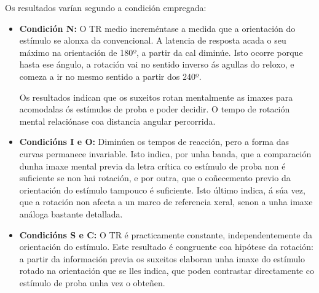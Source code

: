 \documentclass[a4paper,11pt]{article}
\begin{document}
Os resultados varían segundo a condición empregada:
\begin{itemize}
	\item \textbf{Condición N:} O TR medio increméntase a medida que a orientación do estímulo se 
	alonxa da convencional. A latencia de resposta acada o seu máximo na orientación de 180º, a 
	partir da cal diminúe. Isto ocorre porque hasta ese ángulo, a rotación vai no sentido inverso ás 
	agullas do reloxo, e comeza a ir no mesmo sentido a partir dos 240º. 
	
	Os resultados indican que os suxeitos rotan mentalmente as imaxes para acomodalas ós estímulos 
	de proba e poder decidir. O tempo de rotación mental relaciónase coa distancia angular 
	percorrida.
	\item \textbf{Condicións I e O:} Diminúen os tempos de reacción, pero a forma das curvas 
	permanece invariable. Isto indica, por unha banda, que a comparación dunha imaxe mental previa 
	da letra crítica co estímulo de proba non é suficiente se non hai rotación, e por outra, que o 
	coñecemento previo da orientación do estímulo tampouco é suficiente. Isto último indica, á súa 
	vez, que a rotación non afecta a un marco de referencia xeral, senon a unha imaxe análoga 
	bastante detallada.
	\item \textbf{Condicións S e C:} O TR é practicamente constante, independentemente da 
	orientación do estímulo. Este resultado é congruente coa hipótese da rotación: a partir da 
	información previa os suxeitos elaboran unha imaxe do estímulo rotado na orientación que se lles 
	indica, que poden contrastar directamente co estímulo de proba unha vez o obteñen.
\end{itemize}

\begin{figure}[h!]
	\centering
\end{figure}
\end{document}
